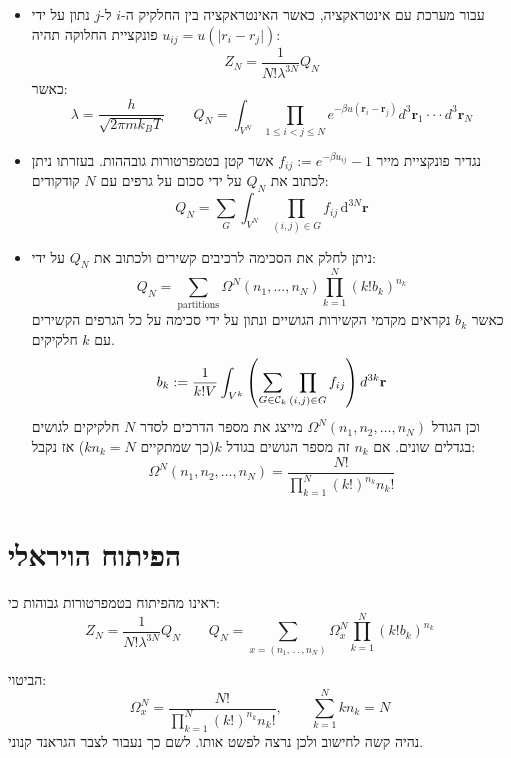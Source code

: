 \documentclass{tstextbook}
\begin{document}
\begin{summary}
  \begin{itemize}
    \item עבור מערכת עם אינטראקציה, כאשר האינטראקציה בין החלקיק ה-\(i\) ל-\(j\) נתון על ידי \(u_{ij}=u(\lvert r_{i}-r_{j} \rvert)\) פונקציית החלוקה תהיה:
$$Z_{N}=\frac{1}{N!\lambda^{3N}}Q_{N}$$
כאשר:
$$\lambda=\frac{h}{\sqrt{ 2\pi mk_{B}T }} \qquad Q_{N}=\int_{V^{N}}\prod_{1\leq i<j\leq N}e^{-\beta u\left( \mathbf{r}_{i}-\mathbf{r}_{j} \right)}d^{3}\mathbf{r}_{1}\cdot\cdot\cdot d^{3}\mathbf{r}_{N}$$
    \item נגדיר פונקציית מייר \(f_{i j}:=e^{-\beta u_{i j}}-1\) אשר קטן בטמפרטורות גובההות. בעזרתו ניתן לכתוב את \(Q_{N}\) על ידי סכום על גרפים עם \(N\) קודקודים:
$$Q_{N}=\sum_{G}\int_{V^{N}}\prod_{(i,j)\in G}f_{i j}\,\mathrm{d}^{3N}\mathbf{r}$$
    \item ניתן לחלק את הסכימה לרכיבים קשירים ולכתוב את \(Q_{N}\) על ידי:
$$Q_{N}=\sum_{\mathrm{partitions}}\Omega^{N}(n_{1},...,n_{N})\prod_{k=1}^{N}(k!b_{k})^{n_{k}}$$
כאשר \(b_{k}\) נקראים מקדמי הקשירות הגושיים ונתון על ידי סכימה על כל הגרפים הקשירים עם \(k\) חלקיקים.
$$b_{k}:=\frac{1}{k!V}\int_{V^{k}}\left(\sum_{G\in{\mathcal{C}}_{k}}\prod_{(i,j)\in G}f_{i j}\right)d^{3k}{\bf r}$$
וכן הגודל \(\Omega^{N}(n_{1},n_{2},\ldots,n_{N})\) מייצג את מספר הדרכים לסדר \(N\) חלקיקים לגושים בגדלים שונים. אם \(n_{k}\) זה מספר הגושים בגודל \(k\)(כך שמתקיים \(kn_{k}=N\)) אז נקבל:
$$\Omega^{N}(n_{1},n_{2},\ldots,n_{N})=\frac{N!}{\prod_{k=1}^{N}(k!)^{n_{k}}n_{k}!}$$
  \end{itemize}
\end{summary}
\section{הפיתוח הויראלי}

\begin{reminder}
ראינו מהפיתוח בטמפרטורות גבוהות כי:
$$Z_{N}=\frac{1}{N!\lambda^{3N}}Q_{N}\qquad Q_{N}=\sum_{x=\left(n_{1},\,.\,.\,,n_{N}\right)}\Omega_{x}^{N}\prod_{k=1}^{N}(k!b_{k})^{n_{k}}$$

\end{reminder}
הביטוי:
$$\Omega_{x}^{N}={\frac{N!}{\prod_{k=1}^{N}(k!)^{n_{k}}n_{k}!}},\qquad\sum_{k=1}^{N}k n_{k}=N$$
נהיה קשה לחישוב ולכן נרצה לפשט אותו. לשם כך נעבור לצבר הגראנד קנוני.
\end{document}
